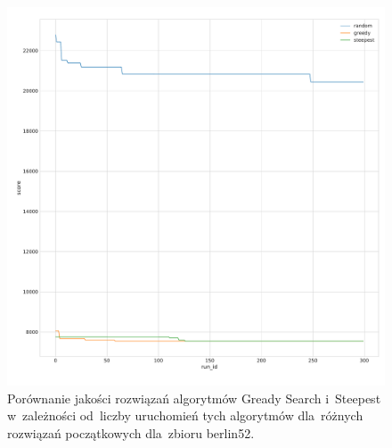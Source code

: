 \begin{figure}[H]
\begin{center}
\includegraphics[width=1.0\textwidth]{graphs/multi_start_scoreberlin52.pdf}
\end{center}
\caption{Porównanie jakości rozwiązań algorytmów Gready Search i~Steepest w~zależności od~liczby uruchomień tych algorytmów dla~różnych rozwiązań początkowych dla~zbioru berlin52.}
\label{fig:more_berlin}
\end{figure}

